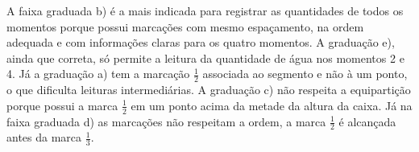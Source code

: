 \documentclass[10 pt,usenames,dvipsnames, oneside]{article}
\begin{document}
\ifdefined\prof
\begin{solucao}

A faixa graduada b) é a mais indicada para registrar as quantidades de todos os momentos porque possui marcações com mesmo espaçamento, na ordem adequada e com informações claras para os quatro momentos. A graduação e), ainda que correta, só permite a leitura da quantidade de água nos momentos 2 e 4. Já a graduação a) tem a marcação $\frac{1}{2}$ associada ao segmento e não à um ponto, o que dificulta leituras intermediárias. A graduação c) não respeita a equipartição porque possui a marca $\frac{1}{2}$ em um ponto acima da metade da altura da caixa. Já na faixa graduada d) as marcações não respeitam a ordem, a marca $\frac{1}{2}$ é alcançada antes da marca $\frac{1}{3}$. 

\end{solucao}
\fi
\end{document}
